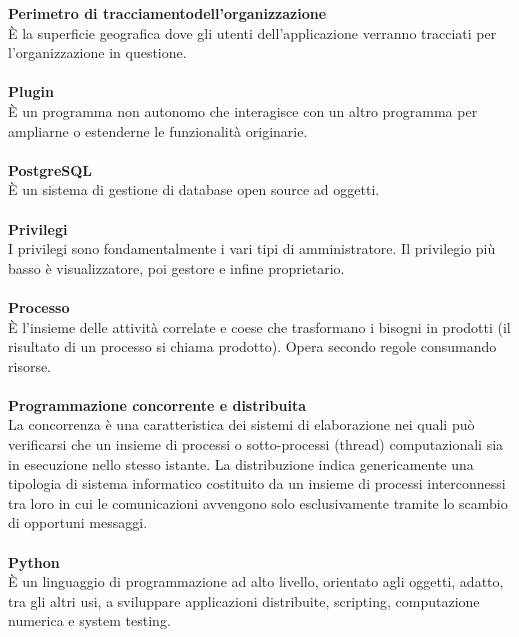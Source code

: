 \textbf{Perimetro di tracciamentodell'organizzazione}\\
È la superficie geografica dove gli utenti dell'applicazione verranno tracciati per l'organizzazione in questione.\\ \\
\textbf{Plugin}\\
È un programma non autonomo che interagisce con un altro programma per ampliarne o estenderne le funzionalità originarie. \\ \\
\textbf{PostgreSQL}\\
È un sistema di gestione di database open source ad oggetti. \\ \\
\textbf{Privilegi}\\
I privilegi sono fondamentalmente i vari tipi di amministratore. Il privilegio più basso è visualizzatore, poi gestore e infine proprietario. \\ \\
\textbf{Processo}\\ 
È l'insieme delle attività correlate e coese che trasformano i bisogni in prodotti (il risultato di un processo si chiama prodotto). Opera secondo regole consumando risorse. \\ \\
\textbf{Programmazione concorrente e distribuita}\\
La concorrenza è una caratteristica dei sistemi di elaborazione nei quali può verificarsi che un insieme di processi o sotto-processi (thread) computazionali sia in esecuzione nello stesso istante. La distribuzione indica genericamente una tipologia di sistema informatico costituito da un insieme di processi interconnessi tra loro in cui le comunicazioni avvengono solo esclusivamente tramite lo scambio di opportuni messaggi. \\ \\
\textbf{Python}\\
È un linguaggio di programmazione ad alto livello, orientato agli oggetti, adatto, tra gli altri usi, a sviluppare applicazioni distribuite, scripting, computazione numerica e system testing. \\ \\
\clearpage